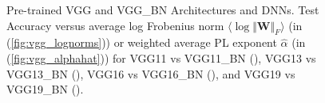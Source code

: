 \begin{figure}[t]
{      \label{fig:vgg_alphahat}
   }
   \caption{%
      Pre-trained VGG and VGG\_BN Architectures and DNNs.  
      Test Accuracy versus
      average log Frobenius norm $\langle\log\Vert\mathbf{W}\Vert_{F}\rangle$ (in (\ref{fig:vgg_lognorms}))
      or
      weighted average PL exponent $\hat{\alpha}$ (in (\ref{fig:vgg_alphahat}))
      for
      VGG11 vs VGG11\_BN ({\color{blue}{blue}}),
      VGG13 vs VGG13\_BN ({\color{orange}{orange}}),
      VGG16 vs VGG16\_BN ({\color{green}{green}}),  and
      VGG19 vs VGG19\_BN ({\color{red}{red}}). 
   }
   \label{fig:vgg}
\end{figure}




